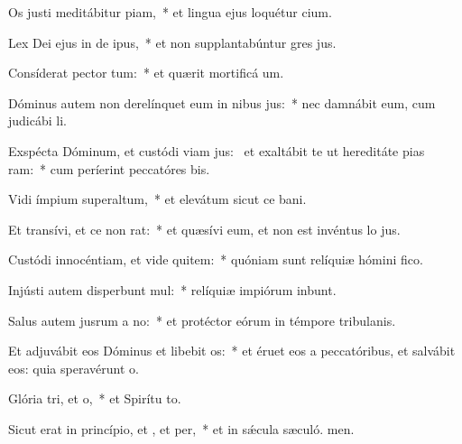 \item Os justi meditábitur piam,~* et lingua ejus loquétur cium.
\item Lex Dei ejus in de ipus,~* et non supplantabúntur gres jus.
\item Consíderat pector tum:~* et quærit mortificá um.
\item Dóminus autem non derelínquet eum in nibus jus:~* nec damnábit eum, cum judicábi li.
\item Exspécta Dóminum, et custódi viam jus:~\pscross{} et exaltábit te ut hereditáte pias ram:~* cum períerint peccatóres bis.
\item Vidi ímpium superaltum,~* et elevátum sicut ce bani.
\item Et transívi, et ce non rat:~* et quæsívi eum, et non est invéntus lo jus.
\item Custódi innocéntiam, et vide quitem:~* quóniam sunt relíquiæ hómini fico.
\item Injústi autem disperbunt mul:~* relíquiæ impiórum inbunt.
\item Salus autem jusrum a no:~* et protéctor eórum in témpore tribulanis.
\item Et adjuvábit eos Dóminus et libebit os:~* et éruet eos a peccatóribus, et salvábit eos: quia speravérunt  o.
\item Glória tri, et o,~* et Spirítu to.
\item Sicut erat in princípio, et , et per,~* et in sǽcula sæculó. men.
